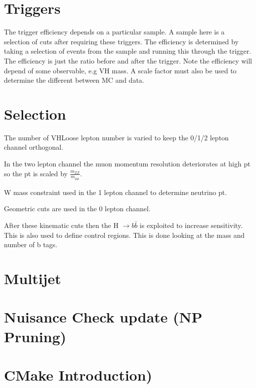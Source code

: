 \documentclass[idxtotoc,hyperref,openany]{labbook} %
\begin{document}
\section{Triggers}
The trigger efficiency depends on a particular sample. A sample here is a selection of cuts after requiring these triggers.  The efficiency is determined by taking a selection of events from the sample and running this through the trigger. The efficiency is just the ratio before and after the trigger. Note the efficiency will depend of some observable, e.g VH mass. A scale factor must also be used to determine the different between MC and data. 

\section{Selection}

The number of VHLoose lepton number is varied to keep the 0/1/2 lepton channel orthogonal. 

In the two lepton channel the muon momentum resolution deteriorates at high pt so the pt is scaled by $\frac{m_{ZZ}}{m_{\mu \mu}}$.

W mass constraint used in the 1 lepton channel to determine neutrino pt. 

Geometric cuts are used in the 0 lepton channel. 

After these kinematic cuts then the H $\rightarrow b\bar{b}$ is exploited to increase sensitivity. This is also used to define control regions. This is done looking at the mass and number of b tags.  

\section{Multijet}


\section{Nuisance Check update (NP Pruning)}


\section{CMake Introduction)}
%
%  
%  
%  
\end{document}
